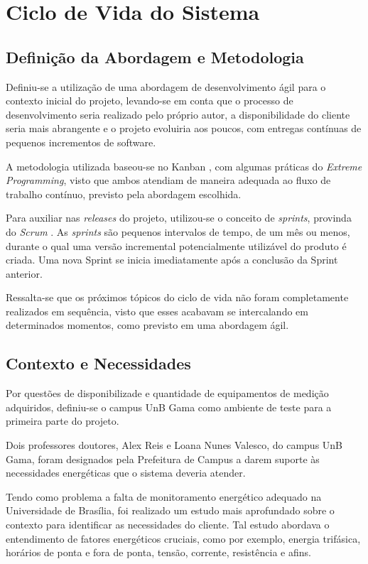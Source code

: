 \chapter{Ciclo de Vida do Sistema}
\section{Definição da Abordagem e Metodologia}
Definiu-se a utilização de uma abordagem de desenvolvimento ágil \cite{beck2001agile} para o contexto inicial do projeto, levando-se em conta que o processo de desenvolvimento seria realizado pelo próprio autor, a disponibilidade do cliente seria mais abrangente e o projeto evoluiria aos poucos, com entregas contínuas de pequenos incrementos de software.

A metodologia utilizada baseou-se no Kanban \cite{radigan_2015}, com algumas práticas do \textit{Extreme Programming}, visto que ambos atendiam de maneira adequada ao fluxo de trabalho contínuo, previsto pela abordagem escolhida.

Para auxiliar nas \textit{releases} do projeto, utilizou-se o conceito de \textit{sprints}, provinda do \textit{Scrum} \cite{scrum_guide}. As \textit{sprints} são pequenos intervalos de tempo, de um mês ou menos, durante o qual uma versão incremental potencialmente utilizável do produto é criada. Uma nova Sprint se inicia imediatamente após a conclusão da Sprint anterior.

Ressalta-se que os próximos tópicos do ciclo de vida não foram completamente realizados em sequência, visto que esses acabavam se intercalando em determinados momentos, como previsto em uma abordagem ágil.

\section{Contexto e Necessidades}
Por questões de disponibilizade e quantidade de equipamentos de medição adquiridos, definiu-se o campus UnB Gama como ambiente de teste para a primeira parte do projeto.

Dois professores doutores, Alex Reis e Loana Nunes Valesco, do campus UnB Gama, foram designados pela Prefeitura de Campus a darem suporte às necessidades energéticas que o sistema deveria atender.

Tendo como problema a falta de monitoramento energético adequado na Universidade de Brasília, foi realizado um estudo mais aprofundado sobre o contexto para identificar as necessidades do cliente. Tal estudo abordava o entendimento de fatores energéticos cruciais, como por exemplo, energia trifásica, horários de ponta e fora de ponta, tensão, corrente, resistência e afins.

